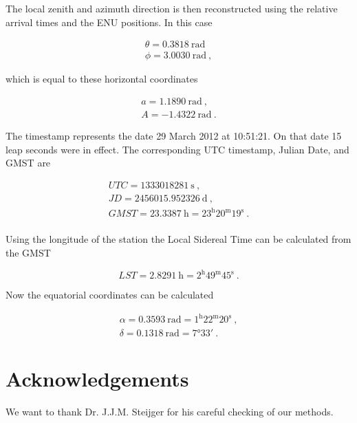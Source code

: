 The local zenith and azimuth direction is then reconstructed using the
relative arrival times and the ENU positions. In this case

\begin{equation}
    \begin{array}{l}
        \theta = \SI{0.3818}{\radian} \, \\
        \phi = \SI{3.0030}{\radian} \ ,
    \end{array}
\end{equation}

\noindent which is equal to these horizontal coordinates

\begin{equation}
    \begin{array}{l}
        a = \SI{1.1890}{\radian} \ , \\
        A = \SI{-1.4322}{\radian} \ .
    \end{array}
\end{equation}

The \gps timestamp represents the date 29 March 2012 at 10:51:21. On
that date 15 leap seconds were in effect. The corresponding UTC
timestamp, Julian Date, and GMST are

\begin{equation}
    \begin{array}{l}
        \mathit{UTC} = \SI{1333018281}{\second} \ , \\
        \mathit{JD} = \SI{2456015.952326}{\day} \ , \\
        \mathit{GMST} = \SI{23.3387}{\hour} = 23^\mathrm{h}20^\mathrm{m}19^\mathrm{s} \ . \\
    \end{array}
\end{equation}

Using the longitude of the station the Local Sidereal Time can be
calculated from the GMST

\begin{equation}
    \mathit{LST} = \SI{2.8291}{\hour} = 2^\mathrm{h}49^\mathrm{m}45^\mathrm{s} \ .
\end{equation}

Now the equatorial coordinates can be calculated

\begin{equation}
    \begin{array}{l}
        \alpha = \SI{0.3593}{\radian} = 1^\mathrm{h}22^\mathrm{m}20^\mathrm{s} \ , \\
        \delta = \SI{0.1318}{\radian} = \ang{7;33;} \ .
    \end{array}
\end{equation}


\section{Acknowledgements}

We want to thank Dr. J.J.M. Steijger for his careful checking of our
methods.

